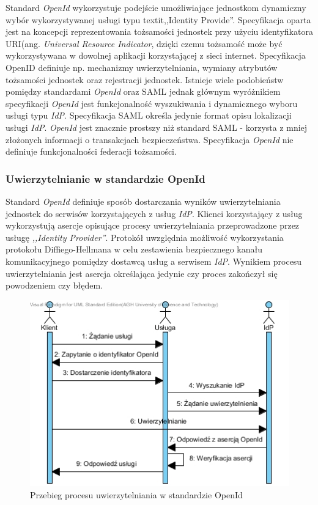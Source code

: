 	Standard \textit{OpenId} wykorzystuje podejście umożliwiające jednostkom dynamiczny wybór wykorzystywanej usługi typu textit{,,Identity Provide''}. Specyfikacja oparta jest na koncepcji reprezentowania tożsamości jednostek przy użyciu identyfikatora URI(ang. \textit{Universal Resource Indicator}, dzięki czemu tożsamość może być wykorzystywana w dowolnej aplikacji korzystającej z sieci internet. Specyfikacja OpenID definiuje np. mechanizmy uwierzytelniania, wymiany atrybutów tożsamości jednostek oraz rejestracji jednostek. Istnieje wiele podobieństw pomiędzy standardami \textit{OpenId} oraz SAML jednak głównym wyróżnikiem specyfikacji \textit{OpenId} jest funkcjonalność wyszukiwania i dynamicznego wyboru usługi typu \textit{IdP}. Specyfikacja SAML określa jedynie format opisu lokalizacji usługi \textit{IdP}. \textit{OpenId} jest znacznie prostszy niż standard SAML - korzysta z mniej złożonych informacji o transakcjach bezpieczeństwa. Specyfikacja \textit{OpenId} nie definiuje funkcjonalności federacji tożsamości\cite{Bertino11}.

	\subsubsection{Uwierzytelnianie w standardzie OpenId}

		Standard \textit{OpenId} definiuje sposób dostarczania wyników uwierzytelniania jednostek do serwisów korzystających z usług \textit{IdP}. Klienci korzystający z usług wykorzystują asercje opisujące procesy uwierzytelniania przeprowadzone przez usługę \textit{,,Identity Provider''}. Protokół uwzględnia możliwość wykorzystania protokołu Diffiego-Hellmana w celu zestawienia bezpiecznego kanału komunikacyjnego pomiędzy dostawcą usług a serwisem \textit{IdP}. Wynikiem procesu uwierzytelniania jest asercja określająca jedynie czy proces zakończył się powodzeniem czy błędem. 

		\begin{figure}[h]
			\centering
			\includegraphics{img/OpenIdAuthentication.jpg}
			\caption{Przebieg procesu uwierzytelniania w standardzie OpenId}
			\label{OpenIdAuthentication}
		\end{figure}

